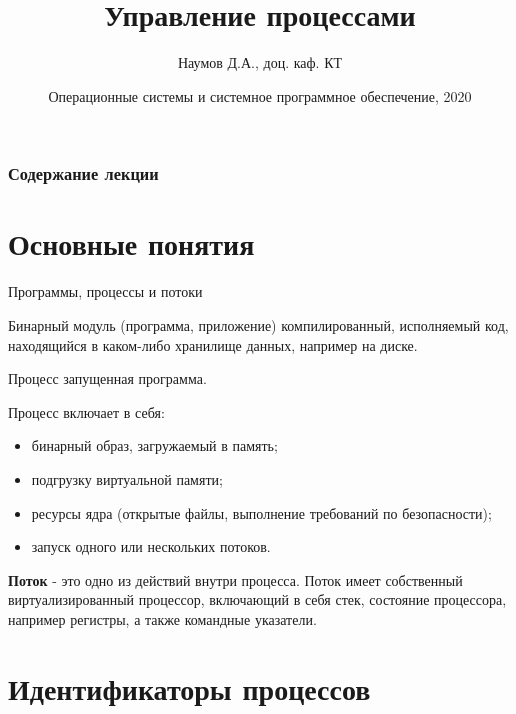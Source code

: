 \documentclass[xcolor=table]{beamer}
\title[Язык C]{Управление процессами}
\author{Наумов Д.А., доц. каф. КТ}
\date[30.10.2019] {Операционные системы и системное программное обеспечение, 2020}
\begin{document}
\begin{frame}
  \titlepage
\end{frame}
  
\begin{frame}
  \frametitle{Содержание лекции}
  \tableofcontents  
\end{frame}

\section{Основные понятия}

\begin{frame}{Программы, процессы и потоки}
	\begin{block}{Бинарный модуль (программа, приложение)}
		компилированный, исполняемый код, находящийся в каком-либо хранилище данных, например на диске.
	\end{block}
	\begin{block}{Процесс}
		запущенная программа.
	\end{block}
	Процесс включает в себя:
	\begin{itemize}
		\item бинарный образ, загружаемый в память;
		\item подгрузку виртуальной памяти;
		\item ресурсы ядра (открытые файлы, выполнение требований по безопасности);
		\item запуск одного или нескольких потоков.
	\end{itemize}
	\textbf{Поток} - это одно из действий внутри процесса. Поток имеет собственный виртуализированный процессор, включающий в себя стек, состояние процессора, например регистры, а также командные указатели.
\end{frame}

\section{Идентификаторы процессов}
\end{document}
